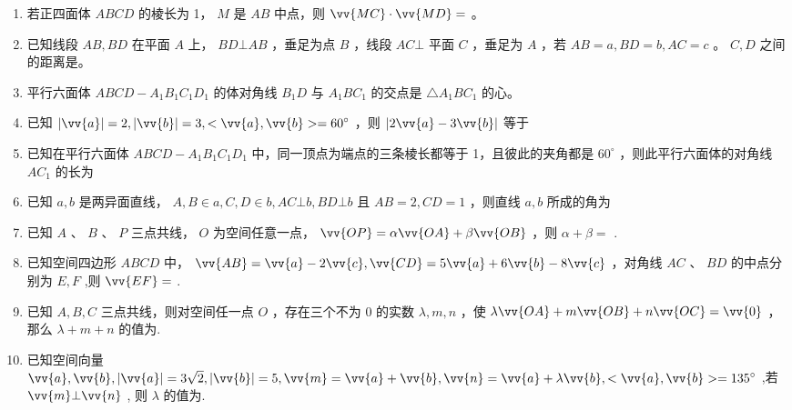 \begin{enumerate}
    \item 若正四面体 ${ABCD}$ 的棱长为 1， $M$ 是 ${AB}$ 中点，则 $\vv{MC} \cdot  \vv{MD} =$ 。

    \item 已知线段 ${AB},{BD}$ 在平面 $A$ 上， ${BD} \bot  {AB}$ ，垂足为点 $B$ ，线段 ${AC} \bot$ 平面 $C$ ，垂足为 $A$ ，若 ${AB} = a,{BD} = b,{AC} = c$ 。 $C,D$ 之间的距离是。

    \item 平行六面体 ${ABCD} - {A}_{1}{B}_{1}{C}_{1}{D}_{1}$ 的体对角线 ${B}_{1}D$ 与 ${A}_{1}B{C}_{1}$ 的交点是 $\bigtriangleup  {A}_{1}B{C}_{1}$ 的心。

    \item 已知 $\left| \vv{a}\right|  = 2,\left| \vv{b}\right|  = 3, < \vv{a},\vv{b} >  = {60}^{ \circ  }$ ，则 $\left| {2\vv{a} - 3\vv{b}}\right|$ 等于


    \item 已知在平行六面体 ${ABCD} - {A}_{1}{B}_{1}{C}_{1}{D}_{1}$ 中，同一顶点为端点的三条棱长都等于 1，且彼此的夹角都是 ${60}^{ \circ  }$ ，则此平行六面体的对角线 $A{C}_{1}$ 的长为


    \item 已知 $a,b$ 是两异面直线， $A,B \in  a,C,D \in  b,{AC} \bot  b,{BD} \bot  b$ 且 ${AB} = 2,{CD} = 1$ ，则直线 $a,b$ 所成的角为


    \item 已知 $A\text{ 、 }B\text{ 、 }P$ 三点共线， $O$ 为空间任意一点， $\vv{OP} = \alpha \vv{OA} + \beta \vv{OB}$ ，则 $\alpha  + \beta  =$ .

    \item 已知空间四边形 ${ABCD}$ 中， $\vv{AB} = \vv{a} - 2\vv{c},\vv{CD} = 5\vv{a} + 6\vv{b} - 8\vv{c}$ ，对角线 ${AC}$ 、 ${BD}$ 的中点分别为 $E,F$ ,则 $\vv{EF} =$ .

    \item 已知 $A,B,C$ 三点共线，则对空间任一点 $O$ ，存在三个不为 0 的实数 $\lambda ,m,n$ ，使 $\lambda \vv{OA}  + m\vv{OB} + n\vv{OC} = \vv{0}$ ，那么 $\lambda  + m + n$ 的值为.

    \item 已知空间向量 $\vv{a},\vv{b},\left| \vv{a}\right|  = 3\sqrt{2},\left| \vv{b}\right|  = 5,\vv{m} = \vv{a} + \vv{b},\vv{n} = \vv{a} + \lambda \vv{b}, < \vv{a},\vv{b} >  = {135}^{ \circ  }$ ,若 $\vv{{m}} \bot  \vv{{n}}$ , 则 $\lambda$ 的值为.


\end{enumerate}
